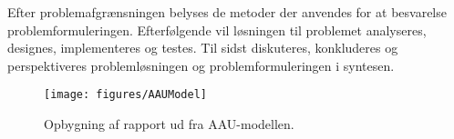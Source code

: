 Efter problemafgrænsningen belyses de metoder der anvendes for at besvarelse problemformuleringen. Efterfølgende vil løsningen til problemet analyseres, designes, implementeres og testes. Til sidst diskuteres, konkluderes og perspektiveres problemløsningen og problemformuleringen i syntesen. 

\begin{figure} [H]
\centering
\texttt{[image: figures/AAUModel]}
\caption{Opbygning af rapport ud fra AAU-modellen. }
\label{fig:AAUModel}
\end{figure} 
